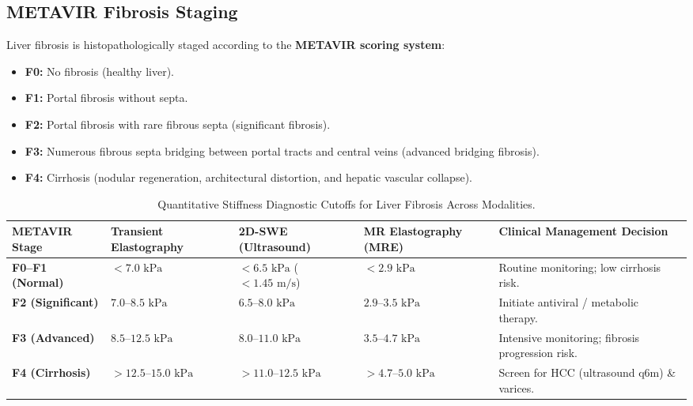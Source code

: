 \documentclass[11pt,a4paper]{article}
\begin{document}
\subsection{METAVIR Fibrosis Staging}
Liver fibrosis is histopathologically staged according to the \textbf{METAVIR scoring system}:
\begin{itemize}
    \item \textbf{F0:} No fibrosis (healthy liver).
    \item \textbf{F1:} Portal fibrosis without septa.
    \item \textbf{F2:} Portal fibrosis with rare fibrous septa (significant fibrosis).
    \item \textbf{F3:} Numerous fibrous septa bridging between portal tracts and central veins (advanced bridging fibrosis).
    \item \textbf{F4:} Cirrhosis (nodular regeneration, architectural distortion, and hepatic vascular collapse).
\end{itemize}

\begin{table}[htbp]
\centering
\small
\setlength{\tabcolsep}{2.5pt}
\caption{Quantitative Stiffness Diagnostic Cutoffs for Liver Fibrosis Across Modalities.}
\label{tab:liver_cutoffs}
\begin{tabular}{p{2.6cm} p{2.8cm} p{2.8cm} p{2.8cm} p{3.8cm}}
\toprule
\textbf{METAVIR Stage} & \textbf{Transient Elastography} & \textbf{2D-SWE (Ultrasound)} & \textbf{MR Elastography (MRE)} & \textbf{Clinical Management Decision} \\
\midrule
\textbf{F0--F1 (Normal)} & $< 7.0\text{ kPa}$ & $< 6.5\text{ kPa}$ ($< 1.45\text{ m/s}$) & $< 2.9\text{ kPa}$ & Routine monitoring; low cirrhosis risk. \\
\addlinespace
\textbf{F2 (Significant)} & $7.0\text{--}8.5\text{ kPa}$ & $6.5\text{--}8.0\text{ kPa}$ & $2.9\text{--}3.5\text{ kPa}$ & Initiate antiviral / metabolic therapy. \\
\addlinespace
\textbf{F3 (Advanced)} & $8.5\text{--}12.5\text{ kPa}$ & $8.0\text{--}11.0\text{ kPa}$ & $3.5\text{--}4.7\text{ kPa}$ & Intensive monitoring; fibrosis progression risk. \\
\addlinespace
\textbf{F4 (Cirrhosis)} & $> 12.5\text{--}15.0\text{ kPa}$ & $> 11.0\text{--}12.5\text{ kPa}$ & $> 4.7\text{--}5.0\text{ kPa}$ & Screen for HCC (ultrasound q6m) \& varices. \\
\bottomrule
\end{tabular}
\end{table}
\end{document}
